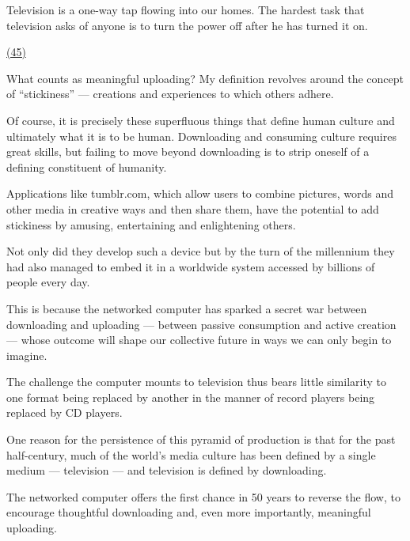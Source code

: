 \qquad Television is a one-way tap flowing into our homes. The hardest task that television asks of anyone is to turn the power off after he has turned it on.

\qquad \ul{(45) \quad\quad\quad\quad\quad\quad\quad\quad\quad\quad\quad\quad}

\qquad What counts as meaningful uploading? My definition revolves around the concept of ``stickiness'' --- creations and experiences to which others adhere.

\vspace{6pt}

\qquad [A] Of course, it is precisely these superfluous things that define human culture and ultimately what it is to be human. Downloading and consuming culture requires great skills, but failing to move beyond downloading is to strip oneself of a defining constituent of humanity.

\qquad [B] Applications like tumblr.com, which allow users to combine pictures, words and other media in creative ways and then share them, have the potential to add stickiness by amusing, entertaining and enlightening others.

\qquad [C] Not only did they develop such a device but by the turn of the millennium they had also managed to embed it in a worldwide system accessed by billions of people every day.

\qquad [D] This is because the networked computer has sparked a secret war between downloading and uploading --- between passive consumption and active creation --- whose outcome will shape our collective future in ways we can only begin to imagine.

\qquad [E] The challenge the computer mounts to television thus bears little similarity to one format being replaced by another in the manner of record players being replaced by CD players.

\qquad [F] One reason for the persistence of this pyramid of production is that for the past half-century, much of the world's media culture has been defined by a single medium --- television --- and television is defined by downloading.

\qquad [G] The networked computer offers the first chance in 50 years to reverse the flow, to encourage thoughtful downloading and, even more importantly, meaningful uploading.
